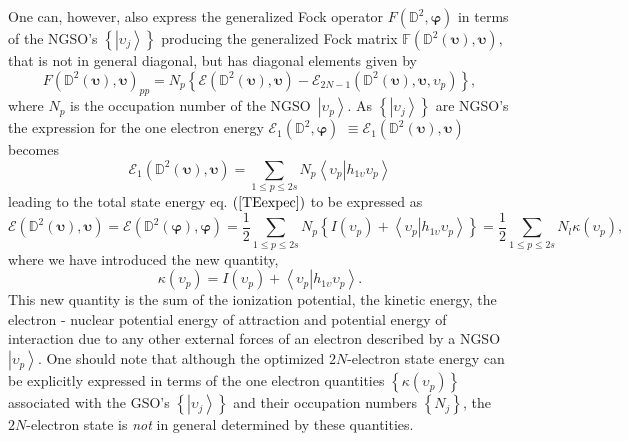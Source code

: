 \documentclass[titlepage]{article}%
\begin{document}
One can, however, also express the generalized Fock operator $F\left(
\mathbb{D}^{2},\bm{\varphi}\right)  $ in terms of the NGSO's $\left\{
\left\vert \upsilon_{j}\right\rangle \right\}  $ producing the generalized
Fock matrix $\mathbb{F}\left(  \mathbb{D}^{2}\left(  \bm{\upsilon}\right)
,\bm{\upsilon}\right)  ,$ that is not in general diagonal, but has diagonal
elements given by
\begin{equation}
F\left(  \mathbb{D}^{2}\left(  \bm{\upsilon}\right)  ,\bm{\upsilon }\right)
_{pp}=N_{p}\left\{  \mathcal{E}\left(  \mathbb{D}^{2}\left(
\bm{\upsilon}\right)  ,\bm{\upsilon}\right)  -\mathcal{E}_{2N-1}\left(
\mathbb{D}^{2}\left(  \bm{\upsilon}\right)  ,\bm{\upsilon,}\upsilon
_{p}\right)  \right\}  ,
\end{equation}
where $N_{p}$ is the occupation number of the NGSO\ $\left\vert \upsilon
_{p}\right\rangle $. As $\left\{  \left\vert \upsilon_{j}\right\rangle
\right\}  $ are NGSO's the expression for the one electron energy
$\mathcal{E}_{1}\left(  \mathbb{D}^{2},\bm{\varphi}\right)  $ $\equiv
\mathcal{E}_{1}\left(  \mathbb{D}^{2}\left(  \bm{\upsilon}\right)
,\bm{\upsilon}\right)  $ becomes%
\begin{equation}
\mathcal{E}_{1}\left(  \mathbb{D}^{2}\left(  \bm{\upsilon}\right)
,\bm{\upsilon}\right)  =\sum_{1\leq p\leq2s}N_{p}\left\langle \left.
\upsilon_{p}\right\vert h_{1\upsilon}\upsilon_{p}\right\rangle
\end{equation}
leading to the total state energy eq. $\left(  \ref{TEexpec}\right)  $ to be
expressed as
\begin{equation}
\mathcal{E}\left(  \mathbb{D}^{2}\left(  \bm{\upsilon}\right)
,\bm{\upsilon}\right)  =\mathcal{E}\left(  \mathbb{D}^{2}\left(
\bm{\varphi}\right)  ,\bm{\varphi}\right)  =\frac{1}{2}\sum_{1\leq p\leq
2s}N_{p}\left\{  I\left(  \upsilon_{p}\right)  +\left\langle \left.
\upsilon_{p}\right\vert h_{1\upsilon}\upsilon_{p}\right\rangle \right\}
=\frac{1}{2}%
{\textstyle\sum\limits_{1\leq p\leq2s}}
N_{l}\kappa\left(  \upsilon_{p}\right)  , \label{Enkappa}%
\end{equation}
where we have introduced the new quantity,
\begin{equation}
\kappa\left(  \upsilon_{p}\right)  =I\left(  \upsilon_{p}\right)
+\left\langle \left.  \upsilon_{p}\right\vert h_{1\upsilon}\upsilon
_{p}\right\rangle . \label{kappa}%
\end{equation}
This new quantity is the sum of the ionization potential, the kinetic energy,
the electron - nuclear potential energy of attraction and potential energy of
interaction due to any other external forces of an electron described by a
NGSO\ $\left\vert \upsilon_{p}\right\rangle $. One should note that although
the optimized $2N$-electron state energy can be explicitly expressed in terms
of the one electron quantities $\left\{  \kappa\left(  \upsilon_{p}\right)
\right\}  $ associated with the GSO's $\left\{  \left\vert \upsilon
_{j}\right\rangle \right\}  $ and their occupation numbers $\left\{
N_{j}\right\}  $, the $2N$-electron state is \emph{not }in general determined
by these quantities.
\end{document}
